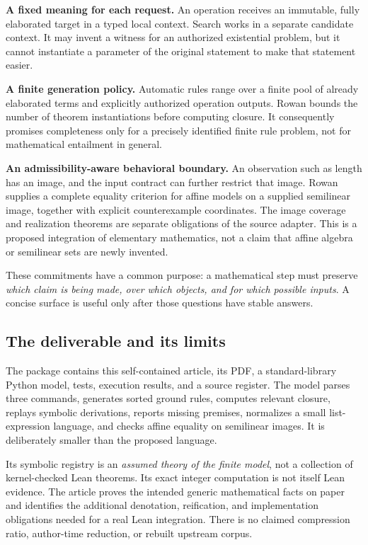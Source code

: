 \documentclass[11pt,letterpaper]{article}
\theoremstyle{definition}\newtheorem{definition}[theorem]{Definition}
\theoremstyle{remark}\newtheorem{remark}[theorem]{Remark}
\begin{document}
\textbf{A fixed meaning for each request.} An operation receives an immutable,
fully elaborated target in a typed local context. Search works in a separate
candidate context. It may invent a witness for an authorized existential
problem, but it cannot instantiate a parameter of the original statement to
make that statement easier.

\textbf{A finite generation policy.} Automatic rules range over a finite pool
of already elaborated terms and explicitly authorized operation outputs.
Rowan bounds the number of theorem instantiations before computing closure.
It consequently promises completeness only for a precisely identified finite
rule problem, not for mathematical entailment in general.

\textbf{An admissibility-aware behavioral boundary.} An observation such as
length has an image, and the input contract can further restrict that image.
Rowan supplies a complete equality criterion for affine models on a supplied
semilinear image, together with explicit counterexample coordinates. The image
coverage and realization theorems are separate obligations of the source
adapter. This is a proposed integration of elementary mathematics, not a claim
that affine algebra or semilinear sets are newly invented.

These commitments have a common purpose: a mathematical step must preserve
\emph{which claim is being made, over which objects, and for which possible
inputs}. A concise surface is useful only after those questions have stable
answers.

\subsection{The deliverable and its limits}
The package contains this self-contained article, its PDF, a standard-library
Python model, tests, execution results, and a source register. The model parses
three commands, generates sorted ground rules, computes relevant closure,
replays symbolic derivations, reports missing premises, normalizes a small
list-expression language, and checks affine equality on semilinear images.
It is deliberately smaller than the proposed language.

Its symbolic registry is an \emph{assumed theory of the finite model}, not a
collection of kernel-checked Lean theorems. Its exact integer computation is
not itself Lean evidence. The article proves the intended generic mathematical
facts on paper and identifies the additional denotation, reification, and
implementation obligations needed for a real Lean integration. There is no
claimed compression ratio, author-time reduction, or rebuilt upstream corpus.
\end{document}
